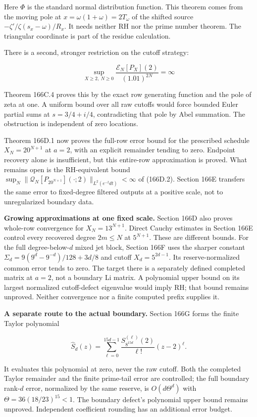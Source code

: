 \documentclass[
  11pt,
]{book}
\begin{document}
Here \(\Phi\) is the standard normal distribution function. This theorem
comes from the moving pole at \(x=\omega(1+\omega)=2T_\omega\) of the
shifted source \(-\zeta'/\zeta(s_x-\omega)/R_x\). It needs neither RH
nor the prime number theorem. The triangular coordinate is part of the
residue calculation.

There is a second, stronger restriction on the cutoff strategy:

\[
\boxed{\sup_{X\ge2,\ N\ge0}
\frac{\mathscr E_N[P_X](2)}{(1.01)^{2N}}=\infty}
\tag{CUT.3}
\]

Theorem 166C.4 proves this by the exact row generating function and the
pole of zeta at one. A uniform bound over all raw cutoffs would force
bounded Euler partial sums at \(s=3/4+i/4\), contradicting that pole by
Abel summation. The obstruction is independent of zero locations.

Theorem 166D.1 now proves the full-row error bound for the prescribed
schedule \(X_N=20^{N+1}\) at \(a=2\), with an explicit remainder tending
to zero. Endpoint recovery alone is insufficient, but this entire-row
approximation is proved. What remains open is the RH-equivalent bound
\(\sup_N\|\mathcal Q_N[P_{20^{N+1}}](\cdot;2)\|_{L^2(e^{-t}dt)}<\infty\)
of (166D.2). Section 166E transfers the same error to fixed-degree
filtered outputs at a positive scale, not to unregularized boundary
data.

\textbf{Growing approximations at one fixed scale.} Section 166D also
proves whole-row convergence for \(X_N=13^{N+1}\). Direct Cauchy
estimates in Section 166E control every recovered degree \(2m\le N\) at
\(5^{N+1}\). These are different bounds. For the full degree-below-\(d\)
mixed jet block, Section 166F uses the sharper constant
\(\Sigma_d=9(9^d-9^{-d})/128+3d/8\) and cutoff \(X_d=5^{2d-1}\). Its
reserve-normalized common error tends to zero. The target there is a
separately defined completed matrix at \(a=2\), not a boundary Li
matrix. A polynomial upper bound on its largest normalized cutoff-defect
eigenvalue would imply RH; that bound remains unproved. Neither
convergence nor a finite computed prefix supplies it.

\textbf{A separate route to the actual boundary.} Section 166G forms the
finite Taylor polynomial

\[
\widehat S_d(z)=\sum_{\ell=0}^{15d-1}
 \frac{S_{8^{15d}}^{(\ell)}(2)}{\ell!}(z-2)^\ell.
\tag{CUT.4}
\]

It evaluates this polynomial at zero, never the raw cutoff. Both the
completed Taylor remainder and the finite prime-tail error are
controlled; the full boundary rank-\(d\) error, normalized by the same
reserve, is \(O(d\Theta^d)\) with \(\Theta=36(18/23)^{15}<1\). The
boundary defect's polynomial upper bound remains unproved. Independent
coefficient rounding has an additional error budget.
\end{document}
